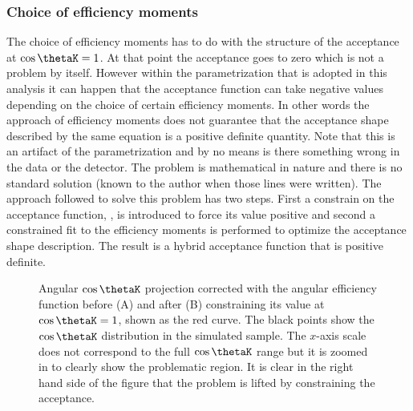 \subsubsection{Choice of efficiency moments}
The choice of efficiency moments has to do with the structure of the acceptance at $\cos\thetaK=1$. At that point the acceptance goes to zero
which is not a problem by itself. However within the parametrization that is adopted in this analysis it can happen that the acceptance function
 can take negative values depending on the choice of certain efficiency moments. In other words the approach of efficiency moments does
not guarantee that the acceptance shape described by the same equation is a positive definite quantity. Note that this is an artifact of the parametrization
and by no means is there something wrong in the data or the detector. The problem is mathematical in nature and there is no standard solution (known
to the author when those lines were written). The approach followed to solve this problem has two steps. First a constrain on the acceptance function, , is
introduced to force its value positive and second a constrained fit to the efficiency moments is performed to optimize the acceptance shape description.
The result is a hybrid acceptance function that is positive definite.

\begin{figure}[h]
  \centering
  \begin{subfigure}{0.5\textwidth}
    \scalebox{1.3}{}
    \caption{}
    \label{angAcc_nom}
  \end{subfigure}%
  \hfill%
  \begin{subfigure}{0.5\textwidth}
    \scalebox{1.3}{}
    \caption{}
    \label{angAcc_constr_fit}
  \end{subfigure}
  \caption{Angular $\cos\thetaK$ \pdf projection corrected with the angular efficiency function before (A) and after (B) constraining its value at $\cos\thetaK=1$, shown as the red curve.
           The black points show the $\cos\thetaK$ distribution in the simulated sample. The $x$-axis scale does not correspond to the full $\cos\thetaK$ range but it is zoomed in to
           clearly show the problematic region. It is clear in the right hand side of the figure that the problem is lifted by constraining the acceptance.
            }
  \label{angAcc_constr}
\end{figure}

